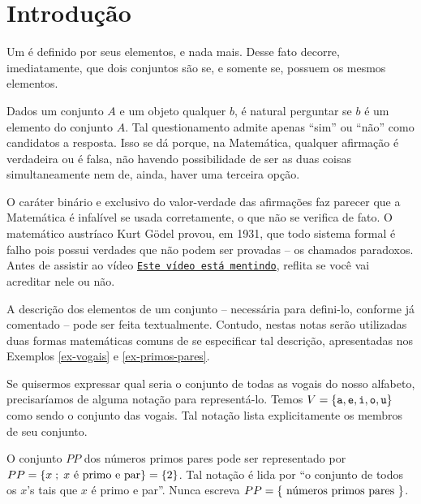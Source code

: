 \section{Introdução}
\label{sec:intro}

Um  é definido por seus elementos, e nada mais.
Desse fato decorre, imediatamente, que dois conjuntos são  se, e somente se, possuem os mesmos elementos.

Dados um conjunto $A$ e um objeto qualquer $b$, é natural perguntar se $b$ é um elemento do conjunto $A$.
Tal questionamento admite apenas ``sim'' ou ``não'' como candidatos a resposta.
Isso se dá porque, na Matemática, qualquer afirmação é verdadeira ou é falsa, não havendo possibilidade de ser as duas coisas simultaneamente nem de, ainda, haver uma terceira opção. 

O caráter binário e exclusivo do valor-verdade das afirmações faz parecer que a Matemática é infalível se usada corretamente, o que não se verifica de fato.
O matemático austríaco Kurt Gödel provou, em 1931, que todo sistema formal é falho pois possui verdades que não podem ser provadas -- os chamados paradoxos.
Antes de assistir ao vídeo \href{https://youtu.be/UI1xR_AECrU}{{\tt Este vídeo está mentindo}}, reflita se você vai acreditar nele ou não.

A descrição dos elementos de um conjunto -- necessária para defini-lo, conforme já comentado -- pode ser feita textualmente.
Contudo, nestas notas serão utilizadas duas formas matemáticas comuns de se especificar tal descrição, apresentadas nos Exemplos \ref{ex-vogais} e \ref{ex-primos-pares}. 

\begin{example}
\label{ex-vogais}
Se quisermos expressar qual seria o conjunto de todas as vogais do nosso alfabeto, precisaríamos de alguma notação para representá-lo. 
Temos $V=\left\{ \texttt{a}, \texttt{e}, \texttt{i}, \texttt{o}, \texttt{u}\right\}$ como sendo o conjunto das vogais. Tal notação lista explicitamente os membros de seu conjunto.
\end{example}

\begin{example}
\label{ex-primos-pares}
O conjunto $PP$ dos números primos pares pode ser representado por $PP = \left\{ x \;;\; x \text{ é primo e par}\right\} = \left\{ 2\right\}$.
Tal notação é lida por ``o conjunto de todos os $x$'s tais que $x$ é primo e par''.
Nunca escreva $PP = \left\{ \text{ números primos pares }\right\}$.
\end{example}

%
